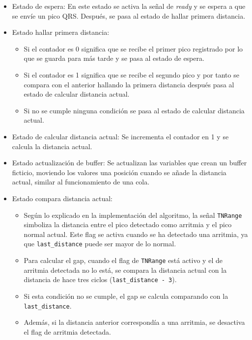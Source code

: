 \begin{itemize}
    \item Estado de espera: En este estado se activa la señal de \textit{ready} y se espera a que se envíe un pico QRS. Después, se pasa al estado de hallar primera distancia.
    \item Estado hallar primera distancia: 
    \begin{itemize}
        \item Si el contador es 0 significa que se recibe el primer pico registrado por lo que se guarda para más tarde y se pasa al estado de espera.
        \item Si el contador es 1 significa que se recibe el segundo pico y por tanto se compara con el anterior hallando la primera distancia después pasa al estado de calcular distancia actual.
        \item Si no se cumple ninguna condición se pasa al estado de calcular distancia actual.   
    \end{itemize}
    \item Estado de calcular distancia actual: Se incrementa el contador en 1 y se calcula la distancia actual.
    \item Estado actualización de buffer: Se actualizan las variables que crean un buffer ficticio, moviendo los valores una posición cuando se añade la distancia actual, similar al funcionamiento de una cola.
    \item Estado compara distancia actual: 
    \begin{itemize}
        \item Según lo explicado en la implementación del algoritmo, la señal \texttt{TNRange} simboliza la distancia entre el pico detectado como arritmia y el pico normal actual. Este flag se activa cuando se ha detectado una arritmia, ya que \texttt{last\_distance} puede ser mayor de lo normal.
        \item Para calcular el gap, cuando el flag de \texttt{TNRange} está activo y el de arritmia detectada no lo está, se compara la distancia actual con la distancia de hace tres ciclos (\texttt{last\_distance - 3}).
        \item Si esta condición no se cumple, el gap se calcula comparando con la \texttt{last\_distance}.
        \item Además, si la distancia anterior correspondía a una arritmia, se desactiva el flag de arritmia detectada.
    \end{itemize}


\end{itemize}
